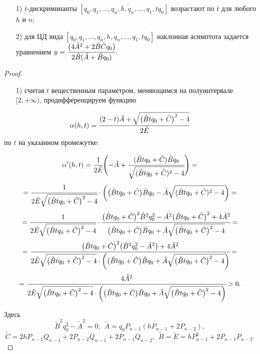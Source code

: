 \begin{theoremr}\label{PiskunovaTretyakov:th:4}
\begin{enumerate}
\item[1) ]$t$-дискриминанты $[{q_0},\overline{{q_1},\dots,{q_n},{h},{q_n},\dots,{q_1},t{q_0}}]$ возрастают по $t$ для любого $h$ и $n$;
\item[2) ]для ЦД вида $[{q_0},\overline{{q_1},\dots,{q_n},{h},{q_n},\dots,{q_1},t{q_0}}]$ наклонная асимптота задается уравнением $y=\cfrac{\bigl(4\tilde{A}^{2}+2\tilde{B}\tilde{C}q_{0}\bigr)}{2\tilde{B}(\tilde{A}+\tilde{B}q_{0})}$.
\end{enumerate}
\end{theoremr}

\begin{proof}
\begin{enumerate}
\item[1) ]считая $t$ вещественным параметром, меняющимся на полуинтервале $[2,+\infty)$,
продифференцируем функцию
\end{enumerate}

\[\alpha(h,t)=\cfrac {(2-t)\tilde{A}+\sqrt {\bigl(\tilde{B}tq_{0}+\tilde{C}\bigr)^{2}-4}}{2\tilde{E}}\]
по $t$ на указанном промежутке:

\[\alpha^\prime(h,t)=\cfrac 1{2\tilde{E}}\Biggl(-\tilde{A}+\cfrac {(\tilde{B}tq_{0}+\tilde{C})\tilde{B}q_{0}}{\sqrt {(\tilde{B}tq_{0}+\tilde{C})^{2}-4}}\Biggr)=\]
\[=\cfrac 1{2\tilde{E}\sqrt {\bigl(\tilde{B}tq_{0}+\tilde{C}\bigr)^{2}-4}}\cdot\biggl(\bigl(\tilde{B}tq_{0}+\tilde{C}\bigr)\tilde{B}q_{0}-\tilde{A}\sqrt {(\tilde{B}tq_{0}+\tilde{C})^{2}-4}\biggr)=\]
\[=\cfrac 1{2\tilde{E}\sqrt {\bigl(\tilde{B}tq_{0}+\tilde{C}\bigr)^{2}-4}}\cdot\cfrac{\bigl(\tilde{B}tq_{0}+\tilde{C}\bigr)^{2}\tilde{B}^{2}q^{2}_{0}-\tilde{A}^{2}
\bigl(\tilde{B}tq_{0}+\tilde{C}\bigr)^{2}+4\tilde{A}^{2}}{\bigl(\tilde{B}tq_{0}+\tilde{C}\bigr)\tilde{B}q_{0}+\tilde{A}\sqrt {\bigl(\tilde{B}tq_{0}+\tilde{C}\bigr)^{2}-4}}=\]
\[=\cfrac{\bigl(\tilde{B}tq_{0}+\tilde{C}\bigr)^{2}\bigl(\tilde{B}^{2}q^{2}_{0}-\tilde{A}^{2}\bigr)+4\tilde{A}^{2}}
{2\tilde{E}\sqrt {\bigl(\tilde{B}tq_{0}+\tilde{C}\bigr)^{2}-4}\cdot\biggl(\bigl(\tilde{B}tq_{0}+\tilde{C}\bigr)\tilde{B}q_{0}+\tilde{A}\sqrt {\bigl(\tilde{B}tq_{0}+\tilde{C}\bigr)^{2}-4}\biggr)}=\]
\[=\cfrac{4\tilde{A}^{2}}{2\tilde{E}\sqrt {\bigl(\tilde{B}tq_{0}+\tilde{C}\bigr)^{2}-4}\cdot\biggl(\bigl(\tilde{B}tq_{0}+\tilde{C}\bigr)\tilde{B}q_{0}+\tilde{A}\sqrt {\bigl(\tilde{B}tq_{0}+\tilde{C}\bigr)^{2}-4}\biggr)}>0.\]

Здесь
\[\tilde{B}^{2}q^{2}_{0}-\tilde{A}^{2}=0, \ \ \tilde{A}=q_{0}P_{n-1}(hP_{n-1}+2P_{n-2}),\]
\[\tilde{C}=2hP_{n-1}Q_{n-1}+2P_{n-2}Q_{n-1}+2P_{n-1}Q_{n-2},\ \ \tilde{B}=\tilde{E}=hP^{2}_{n-1}+2P_{n-1}P_{n-2}.\]


\end{proof}

